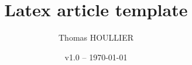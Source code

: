 \documentclass[letterpaper]{article}
\title{Latex article template}
\author{Thomas HOULLIER}
\begin{document}
\frenchspacing
\date{v1.0 -- \today}
\maketitle

\begin{versionhistory}
\end{versionhistory}

\tableofcontents
\thispagestyle{FirstPage}
\pagestyle{plain}


\appendix
\cleardoublepage


\apptocmd{\thebibliography}{\raggedright}{}{}
\begingroup
{}
\setlength\bibitemsep{0pt}
\printbibliography
\endgroup
\end{document}
